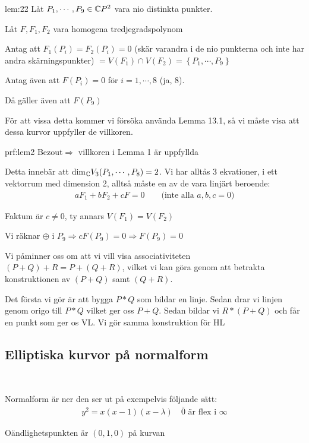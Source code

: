\par\bigskip
\begin{lem}[2]{lem:22}
  Låt $P_1,\cdots,P_9\in\mathbb{C} P^2$ vara nio distinkta punkter.\par
  \noindent Låt $F, F_1, F_2$ vara homogena tredjegradspolynom\par
  \noindent Antag att $F_1(P_i) = F_2(P_i) = 0$ (skär varandra i de nio punkterna och inte har andra skärningspunkter) $= V(F_1)\cap V(F_2) = \left\{P_1,\cdots,P_9\right\}$\par
  \noindent Antag även att $F(P_i) = 0$ för $i=1,\cdots, 8$ (ja, 8).\par
  \noindent Då gäller även att $F(P_9)$
\end{lem}
\par\bigskip
\noindent För att vissa detta kommer vi försöka använda Lemma 13.1, så vi måste visa att dessa kurvor uppfyller de villkoren.
\par\bigskip
\begin{prf}[Lemma 2]{prf:lem2}
  Bezout$\Rightarrow$ villkoren i Lemma 1 är uppfyllda\par
  \noindent Detta innebär att dim$_{\mathbb{C}} V_3(P_1,\cdots, P_8)=2$. Vi har alltås 3 ekvationer, i ett vektorrum med dimension 2, alltså måste en av de vara linjärt beroende:
  \begin{equation*}
    \begin{gathered}
      aF_1+bF_2+cF = 0\qquad\text{(inte alla $a,b,c=0$)}
    \end{gathered}
  \end{equation*}\par
  \noindent Faktum är $c\neq0$, ty annars $V(F_1) = V(F_2)$
  \par\bigskip
  \noindent Vi räknar $\oplus$ i $P_9\Rightarrow cF(P_9)=0\Rightarrow F(P_9)=0$
\end{prf}
\newpage
\noindent Vi påminner oss om att vi vill visa associativiteten $(P+Q)+R = P+(Q+R)$, vilket vi kan göra genom att betrakta konstruktionen av $(P+Q)$ samt $(Q+R)$.\par
\noindent Det första vi gör är att bygga $P*Q$ som bildar en linje. Sedan drar vi linjen genom origo till $P*Q$ vilket ger oss $P+Q$. Sedan bildar vi $R*(P+Q)$ och får en punkt som ger os VL. Vi gör samma konstruktion för HL
\par\bigskip
\subsection{Elliptiska kurvor på normalform}\hfill\\\par
\noindent Normalform är ner den ser ut på exempelvis följande sätt:
\begin{equation*}
  \begin{gathered}
    y^2 = x(x-1)(x-\lambda)\quad \bar{0} \text{ är flex i }\infty
  \end{gathered}
\end{equation*}\par
\noindent Oändlighetspunkten är $(0,1,0)$ på kurvan
